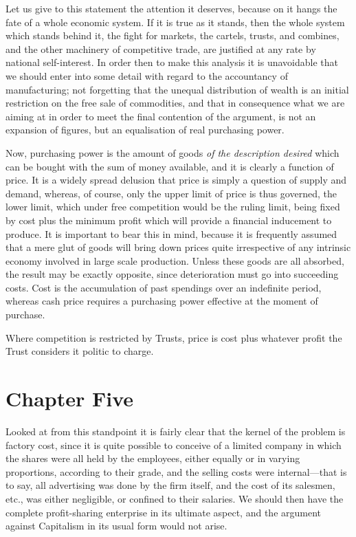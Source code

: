 \documentclass{book}
\begin{document}
Let us give to this statement the attention it deserves, because on it hangs the fate of a whole economic system. If it is true as it stands, then the whole system which stands behind it, the fight for markets, the cartels, trusts, and combines, and the other machinery of competitive trade, are justified at any rate by national self-interest. In order then to make this analysis it is unavoidable that we should enter into some detail with regard to the accountancy of manufacturing; not forgetting that the unequal distribution of wealth is an initial restriction on the free sale of commodities, and that in consequence what we are aiming at in order to meet the final contention of the argument, is not an expansion of figures, but an equalisation of real purchasing power.

Now, purchasing power is the amount of goods \emph{of the description desired} which can be bought with the sum of money available, and it is clearly a function of price. It is a widely spread delusion that price is simply a question of supply and demand, whereas, of course, only the upper limit of price is thus governed, the lower limit, which under free competition would be the ruling limit, being fixed by cost plus the minimum profit which will provide a financial inducement to produce. It is important to bear this in mind, because it is frequently assumed that a mere glut of goods will bring down prices quite irrespective of any intrinsic economy involved in large scale production. Unless these goods are all absorbed, the result may be exactly opposite, since deterioration must go into succeeding costs. Cost is the accumulation of past spendings over an indefinite period, whereas cash price requires a purchasing power effective at the moment of purchase.

Where competition is restricted by Trusts, price is cost plus whatever profit the Trust considers it politic to charge.

\chapter{Chapter Five}
\label{chapter-5}
Looked at from this standpoint it is fairly clear that the kernel of the problem is factory cost, since it is quite possible to conceive of a limited company in which the shares were all held by the employees, either equally or in varying proportions, according to their grade, and the selling costs were internal—that is to say, all advertising was done by the firm itself, and the cost of its salesmen, etc., was either negligible, or confined to their salaries. We should then have the complete profit-sharing enterprise in its ultimate aspect, and the argument against Capitalism in its usual form would not arise.
\end{document}
